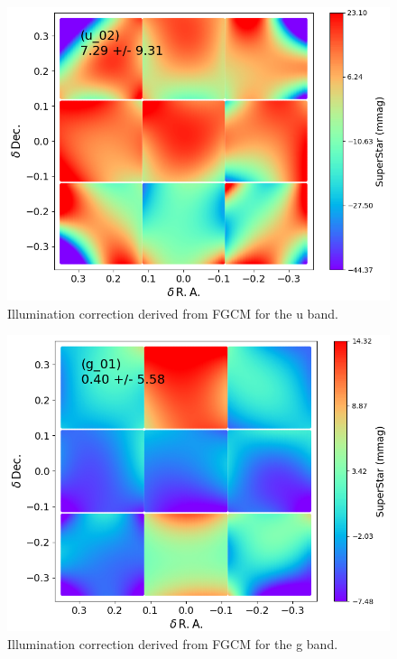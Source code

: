 \begin{figure}
  \includegraphics{photometric_calibration_figures/illumcorr_u.png}
  \caption{Illumination correction derived from FGCM for the u band.}
\end{figure}

\begin{figure}
  \includegraphics{photometric_calibration_figures/illumcorr_g.png}
  \caption{Illumination correction derived from FGCM for the g band.}
\end{figure}

